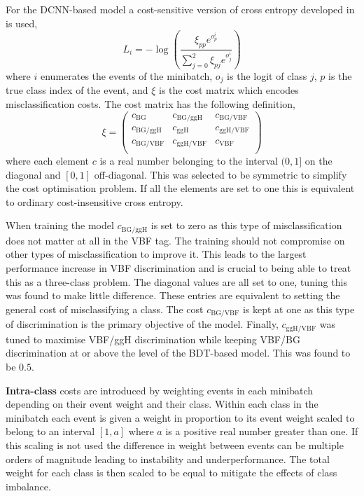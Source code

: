 For the DCNN-based model a cost-sensitive version of cross entropy developed in \cite{CostSensitivity} is used,
\begin{equation}
    L_i = -\log\left(\frac{\xi_{pp}e^{o^{i}_{p}}}{\sum_{j=0}^{2}\xi_{pj}e^{o^{i}_{j}}}\right)
\end{equation} 
where $i$ enumerates the events of the minibatch, $o_j$ is the logit of class $j$, $p$ is the true class index of the event, and $\xi$ is the cost matrix which encodes misclassification costs.
The cost matrix has the following definition,
\begin{equation}
    \xi = \begin{pmatrix}
        c_{\mathrm{BG}} & c_{\mathrm{BG}/\mathrm{ggH}} & c_{\mathrm{BG}/\mathrm{VBF}} \\
        c_{\mathrm{BG}/\mathrm{ggH}} & c_{\mathrm{ggH}} & c_{\mathrm{ggH}/\mathrm{VBF}} \\
        c_{\mathrm{BG}/\mathrm{VBF}} & c_{\mathrm{ggH}/\mathrm{VBF}} & c_{\mathrm{VBF}} \\
    \end{pmatrix}
\end{equation}
where each element $c$ is a real number belonging to the interval $(0,1]$ on the diagonal and $[0,1]$ off-diagonal. 
This was selected to be symmetric to simplify the cost optimisation problem.
If all the elements are set to one this is equivalent to ordinary cost-insensitive cross entropy. 

When training the model $c_{\mathrm{BG}/\mathrm{ggH}}$ is set to zero as this type of misclassification does not matter at all in the VBF tag. 
The training should not compromise on other types of misclassification to improve it. 
This leads to the largest performance increase in VBF discrimination and is crucial to being able to treat this as a three-class problem.
The diagonal values are all set to one, tuning this was found to make little difference. These entries are equivalent to setting the general cost of misclassifying a class.
The cost $c_{\mathrm{BG}/\mathrm{VBF}}$ is kept at one as this type of discrimination is the primary objective of the model. 
Finally, $c_{\mathrm{ggH}/\mathrm{VBF}}$ was tuned to maximise VBF/ggH discrimination while keeping VBF/BG discrimination at or above the level of the BDT-based model. This was found to be $0.5$.

\textbf{Intra-class} costs are introduced by weighting events in each minibatch depending on their event weight and their class.  
Within each class in the minibatch each event is given a weight in proportion to its event weight scaled to belong to an interval $[1,a]$ where $a$ is a positive real number greater than one. 
If this scaling is not used the difference in weight between events can be multiple orders of magnitude leading to instability and underperformance. 
The total weight for each class is then scaled to be equal to mitigate the effects of class imbalance. 

